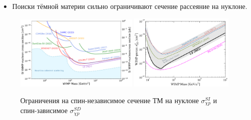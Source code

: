 \begin{itemize}
	\item Поиски тёмной материи сильно ограничивают сечение рассеяние на нуклоне.
\end{itemize}

\begin{figure}
	\includegraphics[width=0.53\textwidth]{images/pdg_si_limits.pdf}
	\includegraphics[width=0.45\textwidth]{images/DirectSD.png}
	\caption{Ограничения на спин-независимое сечение ТМ на нуклоне $\sigma^{SI}_{\chi p}$ и спин-зависимое $\sigma^{SD}_{\chi p}$}
\end{figure}
